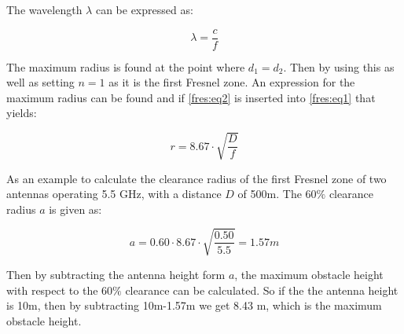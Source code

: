 The wavelength $\lambda$ can be expressed as:

\begin{equation}
\lambda = \frac{c}{f}
\label{fres:eq2}
\end{equation}

\begin{where}
\end{where}






The maximum radius is found at the point where $d_{1} = d_{2}$. Then by using this as well as setting $n=1$ as it is the first Fresnel zone. An expression for the maximum radius can be found and if \autoref{fres:eq2} is inserted into \autoref{fres:eq1} that yields:


\begin{equation}
r = 8.67 \cdot \sqrt{\frac{D}{f}}
\label{fres:eq3}
\end{equation}

\begin{where}
\end{where}

As an example to calculate the clearance radius of the first Fresnel zone of two antennas operating 5.5 GHz, with a distance $D$ of 500m. The 60$\%$ clearance radius $a$ is given as:

\begin{equation}
a = 0.60\cdot8.67 \cdot \sqrt{\frac{0.50}{5.5}} = 1.57 m
\label{fres:eq_ex}
\end{equation}

Then by subtracting the antenna height form $a$, the maximum obstacle height with respect to the 60$\%$ clearance can be calculated. So if the the antenna height is 10m, then by subtracting 10m-1.57m we get 8.43 m, which is the maximum obstacle height.  %





